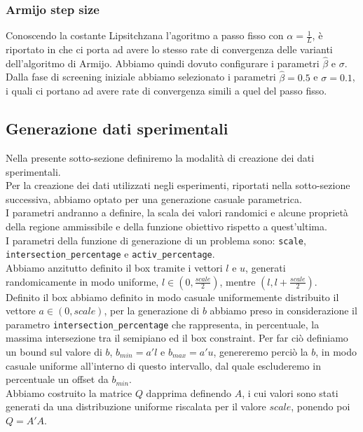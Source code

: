 \documentclass[12pt]{extarticle}
\begin{document}
\subsubsection{Armijo step size}
Conoscendo la costante  Lipsitchzana l'agoritmo a passo fisso con $\alpha = \frac{1}{L}$, è riportato in \cite{gafni1982convergence} che  ci porta ad avere lo stesso rate di convergenza delle varianti dell'algoritmo di Armijo. Abbiamo quindi dovuto configurare i parametri $\hat{\beta}$ e $\sigma$. Dalla fase di screening iniziale abbiamo selezionato i parametri $\hat{\beta}= 0.5$ e $\sigma = 0.1$, i quali ci portano ad avere rate di convergenza simili a quel del passo fisso.
\subsection{Generazione dati sperimentali}
Nella presente sotto-sezione definiremo la modalità di creazione dei dati sperimentali.\\
Per la creazione dei dati utilizzati negli esperimenti, riportati nella sotto-sezione successiva, abbiamo optato per una generazione casuale parametrica.\\
I parametri andranno a definire, la scala dei valori randomici e alcune proprietà della regione ammissibile e della funzione obiettivo rispetto a quest'ultima.\\
I parametri della funzione di generazione di un problema sono: \texttt{scale},\\
\texttt{intersection\_percentage} e \texttt{activ\_percentage}.\\
Abbiamo anzitutto definito il box tramite i vettori $l$ e $u$, generati randomicamente in modo uniforme, $l \in  (0, \frac{scale}{2})$, mentre $(l, l + \frac{scale}{2})$.\\
Definito il box abbiamo definito in modo casuale uniformemente distribuito il vettore $a \in (0, scale)$, per la generazione di $b$ abbiamo preso in considerazione il parametro \texttt{intersection\_percentage} che rappresenta, in percentuale, la massima intersezione tra il semipiano ed il box constraint. Per far ciò definiamo un bound sul valore di $b$, $b_{min} = a'l$ e $b_{max} = a'u$, genereremo perciò la $b$, in modo casuale uniforme all'interno di questo intervallo, dal quale escluderemo in percentuale un offset da $b_{min}$.\\
Abbiamo costruito la matrice $Q$ dapprima definendo $A$, i cui valori sono stati generati da una distribuzione uniforme riscalata per il valore $scale$, ponendo poi $Q = A'A$.\\
\end{document}
